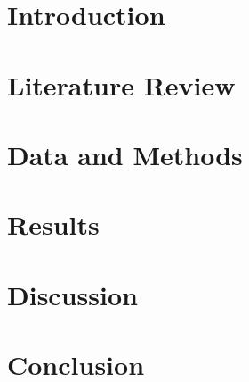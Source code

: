 \documentclass[12pt]{article}
\begin{document}

\section{Introduction}

\section{Literature Review}

\section{Data and Methods}

\section{Results}






\section{Discussion}

\section{Conclusion}
\end{document}
